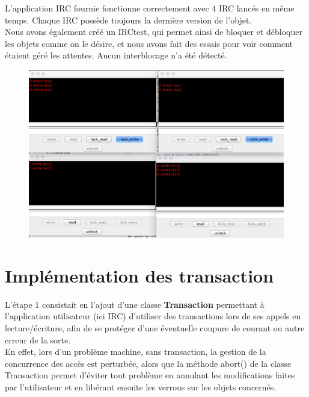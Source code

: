 \documentclass[11pt,a4paper]{report}
\begin{document}
L'application IRC fournie fonctionne correctement avec 4 IRC lancés en même temps. Chaque IRC possède toujours la dernière version de l'objet. \\
Nous avons également créé un IRCtest, qui permet ainsi de bloquer et débloquer les objets comme on le désire, et nous avons fait des essais pour voir comment étaient géré les attentes. Aucun interblocage n'a été détecté.
\begin{figure}[!h]
\begin{center}
\includegraphics[scale=0.5]{IRCtes.png}
\end{center}
\end{figure}


\section{Implémentation des transaction}


L'étape 1 consistait en l’ajout d’une classe \textbf{Transaction}  permettant à l’application utilisateur (ici IRC) d’utiliser des transactions lors de ses appels en lecture/écriture, afin de se protéger d’une éventuelle coupure de courant ou autre erreur de la sorte.\\
En effet, lors d’un problème machine, sans transaction, la gestion de la concurrence des accès est perturbée, alors que la méthode abort() de la classe Transaction permet d’éviter tout problème en annulant les modifications faites par l’utilisateur et en libérant ensuite les verrous sur les objets concernés.\\\\
\end{document}
